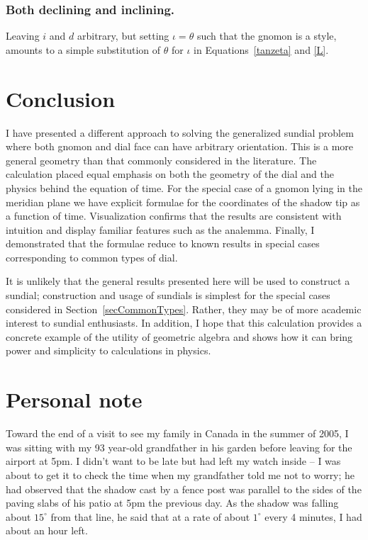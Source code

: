 \documentclass[12pt]{article}
\begin{document}
\subsubsection*{Both declining and inclining.}
%
Leaving $i$ and $d$ arbitrary, but setting $\iota = \theta$ such that the gnomon is a style, amounts to a simple substitution of $\theta$ for $\iota$ in Equations~\ref{tanzeta} and \ref{L}.
%
\section{Conclusion}\label{secConclusion}
%
I have presented a different approach to solving the generalized sundial problem where both gnomon and dial face can have arbitrary orientation. This is a more general geometry than that commonly considered in the literature. The calculation placed equal emphasis on both the geometry of the dial and the physics behind the equation of time. For the special case of a gnomon lying in the meridian plane we have explicit formulae for the coordinates of the shadow tip as a function of time. Visualization confirms that the results are consistent with intuition and display familiar features such as the analemma. Finally, I demonstrated that the formulae reduce to known results in special cases corresponding to common types of dial.

It is unlikely that the general results presented here will be used to construct a sundial; construction and usage of sundials is simplest for the special cases considered in Section~\ref{secCommonTypes}. Rather, they may be of more academic interest to sundial enthusiasts. In addition, I hope that this calculation provides a concrete example of the utility of geometric algebra and shows how it can bring power and simplicity to calculations in physics.
%
\section{Personal note}
%
Toward the end of a visit to see my family in Canada in the summer of 2005, I was sitting with my 93 year-old grandfather in his garden before leaving for the airport at 5pm. I didn't want to be late but had left my watch inside -- I was about to get it to check the time when my grandfather told me not to worry; he had observed that the shadow cast by a fence post was parallel to the sides of the paving slabs of his patio at 5pm the previous day. As the shadow was falling about $15^\circ$ from that line, he said that at a rate of about $1^\circ$ every 4 minutes, I had about an hour left.
\end{document}

